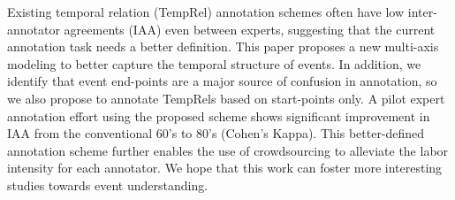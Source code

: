 Existing temporal relation (TempRel) annotation schemes often have low inter-annotator agreements (IAA) even between experts, suggesting that the current annotation task needs a better definition. This paper proposes a new multi-axis modeling to better capture the temporal structure of events. In addition, we identify that event end-points are a major source of confusion in annotation, so we also propose to annotate TempRels based on start-points only. A pilot expert annotation effort using the proposed scheme shows significant improvement in IAA from the conventional 60's to 80's  (Cohen's Kappa). This better-defined annotation scheme further enables the use of crowdsourcing to alleviate the labor intensity for each annotator. We hope that this work can foster more interesting studies towards event understanding.
